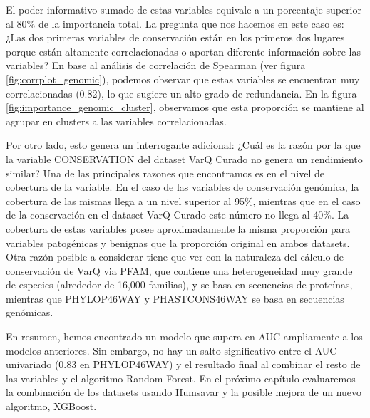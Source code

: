 El poder informativo sumado de estas variables equivale a un porcentaje superior al 80\% de la importancia total. La pregunta que nos hacemos en este caso es: ¿Las dos primeras variables de conservación están en los primeros dos lugares porque están altamente correlacionadas o aportan diferente información sobre las variables? En base al análisis de correlación de Spearman (ver figura \ref{fig:corrplot_genomic}), podemos observar que estas variables se encuentran muy correlacionadas (0.82), lo que sugiere un alto grado de redundancia. En la figura \ref{fig:importance_genomic_cluster}, observamos que esta proporción se mantiene al agrupar en clusters a las variables correlacionadas.

Por otro lado, esto genera un interrogante adicional: ¿Cuál es la razón por la que la variable CONSERVATION del dataset VarQ Curado no genera un rendimiento similar? Una de las principales razones que encontramos es en el nivel de cobertura de la variable. En el caso de las variables de conservación genómica, la cobertura de las mismas llega a un nivel superior al 95\%, mientras que en el caso de la conservación en el dataset VarQ Curado este número no llega al 40\%. La cobertura de estas variables posee aproximadamente la misma proporción para variables patogénicas y benignas que la proporción original en ambos datasets. Otra razón posible a considerar tiene que ver con la naturaleza del cálculo de conservación de VarQ via PFAM, que contiene una heterogeneidad muy grande de especies (alrededor de 16,000 familias), y se basa en secuencias de proteínas, mientras que PHYLOP46WAY y PHASTCONS46WAY se basa en secuencias genómicas.

En resumen, hemos encontrado un modelo que supera en AUC ampliamente a los modelos anteriores. Sin embargo, no hay un salto significativo entre el AUC univariado (0.83 en PHYLOP46WAY) y el resultado final al combinar el resto de las variables y el algoritmo Random Forest. En el próximo capítulo evaluaremos la combinación de los datasets usando Humsavar y la posible mejora de un nuevo algoritmo, XGBoost.

